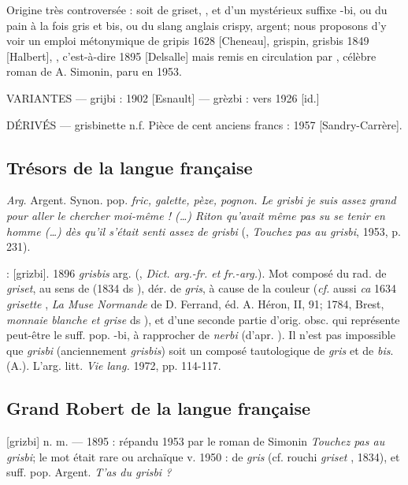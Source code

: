 Origine très controversée : soit de griset, , et d'un mystérieux suffixe -bi, ou du pain à la fois gris et bis, ou du slang anglais crispy, argent; nous proposons d'y voir un emploi métonymique de gripis 1628 [Cheneau], grispin, grisbis 1849 [Halbert], , c'est-à-dire  1895 [Delsalle] mais remis en circulation par , célèbre roman de A. Simonin, paru en 1953.

VARIANTES ---  grijbi : 1902 [Esnault] --- grèzbi : vers 1926 [id.]

DÉRIVÉS --- grisbinette n.f. Pièce de cent anciens francs : 1957
[Sandry-Carrère].


\subsection*{Trésors de la langue française}

\emph{Arg.} Argent. Synon. pop. \emph{fric, galette, pèze, pognon. Le grisbi je suis assez grand pour aller le chercher moi-même ! (\ldots) Riton qu'avait même pas su se tenir en homme (\ldots) dès qu'il s'était senti assez de grisbi} (, \emph{Touchez pas au grisbi}, 1953, p. 231).

 : [grizbi].   1896 \emph{grisbis}
arg.  (, \emph{Dict. arg.-fr. et fr.-arg.}). Mot composé du rad. de \emph{griset}, au sens de  (1834 ds ), dér. de \emph{gris}, à cause de la couleur (\emph{cf.} aussi \emph{ca} 1634 \emph{grisette} , \emph{La Muse Normande} de D. Ferrand, éd. A. Héron, II, 91; 1784, Brest, \emph{monnaie blanche et grise} ds ), et d'une seconde partie d'orig. obsc. qui représente peut-être le suff. pop. -bi, à rapprocher de \emph{nerbi}  (d'apr. ). Il n'est pas impossible que \emph{grisbi} (anciennement \emph{grisbis}) soit un composé tautologique de \emph{gris} et de \emph{bis}.
  (A.). L'arg. litt. \emph{Vie lang.} 1972, pp. 114-117.


\subsection*{Grand Robert de la langue française}

[grizbi] n. m. --- 1895 : répandu 1953 par le roman de Simonin \emph{Touchez pas au grisbi}; le mot était rare ou archaïque v. 1950 : de \emph{gris}  (cf. rouchi \emph{griset} , 1834), et suff. pop.  Argent. \emph{T'as du grisbi ?}

